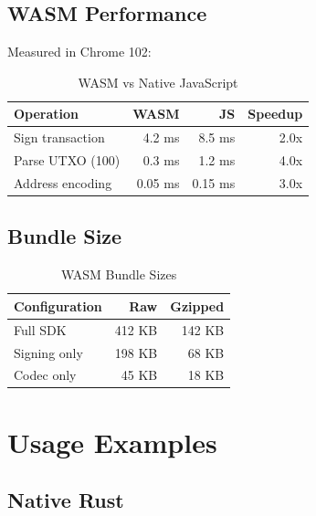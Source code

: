 \documentclass[11pt,twocolumn]{article}
\begin{document}
\subsection{WASM Performance}

Measured in Chrome 102:

\begin{table}[h]
\centering
\caption{WASM vs Native JavaScript}
\begin{tabular}{lrrr}
\toprule
\textbf{Operation} & \textbf{WASM} & \textbf{JS} & \textbf{Speedup} \\
\midrule
Sign transaction & 4.2 ms & 8.5 ms & 2.0x \\
Parse UTXO (100) & 0.3 ms & 1.2 ms & 4.0x \\
Address encoding & 0.05 ms & 0.15 ms & 3.0x \\
\bottomrule
\end{tabular}
\end{table}

\subsection{Bundle Size}

\begin{table}[h]
\centering
\caption{WASM Bundle Sizes}
\begin{tabular}{lrr}
\toprule
\textbf{Configuration} & \textbf{Raw} & \textbf{Gzipped} \\
\midrule
Full SDK & 412 KB & 142 KB \\
Signing only & 198 KB & 68 KB \\
Codec only & 45 KB & 18 KB \\
\bottomrule
\end{tabular}
\end{table}

\section{Usage Examples}

\subsection{Native Rust}
\end{document}
